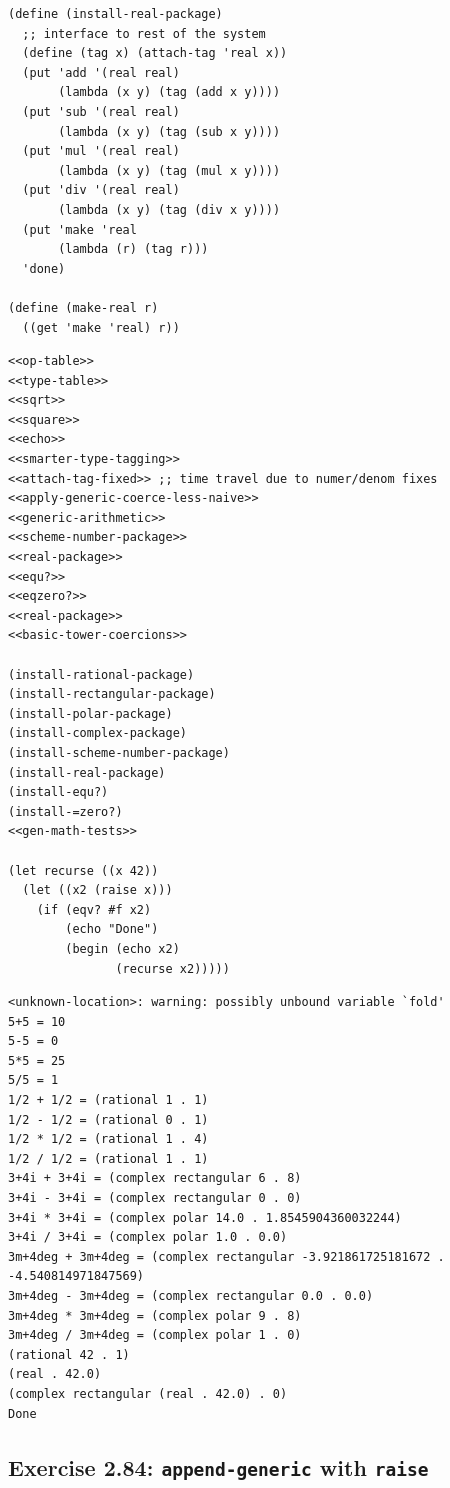 \documentclass[final,fleqn,titlepage,twoside]{article}
\begin{document}
\begin{verbatim}
(define (install-real-package)
  ;; interface to rest of the system
  (define (tag x) (attach-tag 'real x))
  (put 'add '(real real)
       (lambda (x y) (tag (add x y))))
  (put 'sub '(real real)
       (lambda (x y) (tag (sub x y))))
  (put 'mul '(real real)
       (lambda (x y) (tag (mul x y))))
  (put 'div '(real real)
       (lambda (x y) (tag (div x y))))
  (put 'make 'real
       (lambda (r) (tag r)))
  'done)

(define (make-real r)
  ((get 'make 'real) r))
\end{verbatim}

\begin{verbatim}
<<op-table>>
<<type-table>>
<<sqrt>>
<<square>>
<<echo>>
<<smarter-type-tagging>>
<<attach-tag-fixed>> ;; time travel due to numer/denom fixes
<<apply-generic-coerce-less-naive>>
<<generic-arithmetic>>
<<scheme-number-package>>
<<real-package>>
<<equ?>>
<<eqzero?>>
<<real-package>>
<<basic-tower-coercions>>

(install-rational-package)
(install-rectangular-package)
(install-polar-package)
(install-complex-package)
(install-scheme-number-package)
(install-real-package)
(install-equ?)
(install-=zero?)
<<gen-math-tests>>

(let recurse ((x 42))
  (let ((x2 (raise x)))
    (if (eqv? #f x2)
        (echo "Done")
        (begin (echo x2)
               (recurse x2)))))
\end{verbatim}

\begin{verbatim}
<unknown-location>: warning: possibly unbound variable `fold'
5+5 = 10 
5-5 = 0 
5*5 = 25 
5/5 = 1 
1/2 + 1/2 = (rational 1 . 1) 
1/2 - 1/2 = (rational 0 . 1) 
1/2 * 1/2 = (rational 1 . 4) 
1/2 / 1/2 = (rational 1 . 1) 
3+4i + 3+4i = (complex rectangular 6 . 8) 
3+4i - 3+4i = (complex rectangular 0 . 0) 
3+4i * 3+4i = (complex polar 14.0 . 1.8545904360032244) 
3+4i / 3+4i = (complex polar 1.0 . 0.0) 
3m+4deg + 3m+4deg = (complex rectangular -3.921861725181672 . -4.540814971847569) 
3m+4deg - 3m+4deg = (complex rectangular 0.0 . 0.0) 
3m+4deg * 3m+4deg = (complex polar 9 . 8) 
3m+4deg / 3m+4deg = (complex polar 1 . 0) 
(rational 42 . 1) 
(real . 42.0) 
(complex rectangular (real . 42.0) . 0) 
Done 
\end{verbatim}

\subsection{Exercise 2.84: \texttt{append-generic} with \texttt{raise}}
\label{sec:orgcd753a7}
\end{document}
